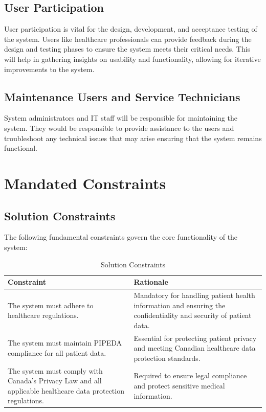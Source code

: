 \documentclass[12pt]{article}
\begin{document}
\subsection{User Participation}
User participation is vital for the design, development, and acceptance testing of the system. Users like healthcare professionals can provide feedback during the design and testing phases to ensure the system meets their critical needs. This will help in gathering insights on usability and functionality, allowing for iterative improvements to the system.

\subsection{Maintenance Users and Service Technicians}
System administrators and IT staff will be responsible for maintaining the system. They would be responsible to provide assistance to the users and troubleshoot any technical issues that may arise ensuring that the system remains functional. 

\section{Mandated Constraints}

\subsection{Solution Constraints}
The following fundamental constraints govern the core functionality of the system:

\begin{table}[H]
\centering
\begin{tabular}{|p{6cm}|p{6cm}|}
\hline
\textbf{Constraint} & \textbf{Rationale} \\
\hline
The system must adhere to healthcare regulations. & Mandatory for handling patient health information and ensuring the confidentiality and security of patient data. \\
\hline
The system must maintain PIPEDA compliance for all patient data. & Essential for protecting patient privacy and meeting Canadian healthcare data protection standards. \\
\hline
The system must comply with Canada's Privacy Law and all applicable healthcare data protection regulations. & Required to ensure legal compliance and protect sensitive medical information. \\
\hline
\end{tabular}
\caption{Solution Constraints}
\label{tab:solution_constraints}
\end{table}
\end{document}

